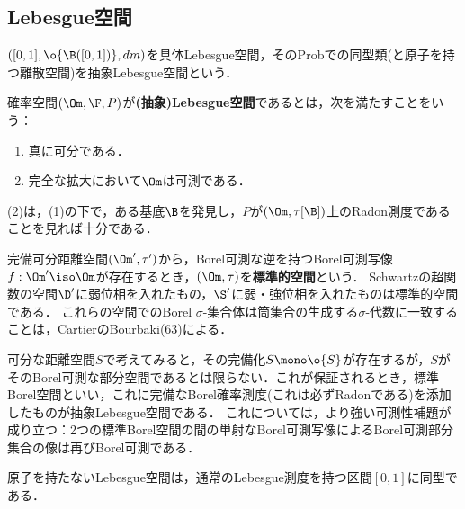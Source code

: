 \documentclass[uplatex,dvipdfmx]{jsreport}
\begin{document}
\subsection{Lebesgue空間}

\begin{tcolorbox}[colframe=ForestGreen, colback=ForestGreen!10!white,breakable,colbacktitle=ForestGreen!40!white,coltitle=black,fonttitle=\bfseries\sffamily,
title=]
    $([0,1],\o{\B([0,1])},dm)$を具体Lebesgue空間，そのProbでの同型類(と原子を持つ離散空間)を抽象Lebesgue空間という．
\end{tcolorbox}

\begin{definition}
    確率空間$(\Om,\F,P)$が\textbf{(抽象)Lebesgue空間}であるとは，次を満たすことをいう：
    \begin{enumerate}
        \item 真に可分である．
        \item 完全な拡大において$\Om$は可測である．
    \end{enumerate}
    (2)は，(1)の下で，ある基底$\B$を発見し，$P$が$(\Om,\tau[\B])$上のRadon測度であることを見れば十分である．
\end{definition}

\begin{definition}
    完備可分距離空間$(\Om',\tau')$から，Borel可測な逆を持つBorel可測写像$f:\Om'\iso\Om$が存在するとき，$(\Om,\tau)$を\textbf{標準的空間}という．
    Schwartzの超関数の空間$\D'$に弱位相を入れたもの，$\S'$に弱・強位相を入れたものは標準的空間である．
    これらの空間でのBorel $\sigma$-集合体は筒集合の生成する$\sigma$-代数に一致することは，CartierのBourbaki(63)による．
\end{definition}
\begin{remarks}
    可分な距離空間$S$で考えてみると，その完備化$S\mono\o{S}$が存在するが，$S$がそのBorel可測な部分空間であるとは限らない．これが保証されるとき，標準Borel空間といい，これに完備なBorel確率測度(これは必ずRadonである)を添加したものが抽象Lebesgue空間である．
    これについては，より強い可測性補題が成り立つ：2つの標準Borel空間の間の単射なBorel可測写像によるBorel可測部分集合の像は再びBorel可測である．
\end{remarks}

\begin{theorem}[Lebesgue空間同型定理]
    原子を持たないLebesgue空間は，通常のLebesgue測度を持つ区間$[0,1]$に同型である．
\end{theorem}
\end{document}
